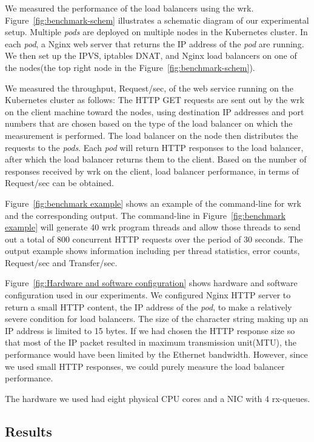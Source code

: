 We measured the performance of the load balancers using the wrk.
Figure~\ref{fig:benchmark-schem} illustrates a schematic diagram of our experimental setup.
Multiple {\em pods} are deployed on multiple nodes in the Kubernetes cluster. 
In each {\em pod}, a Nginx web server that returns the IP address of the {\em pod} are running.
We then set up the IPVS, iptables DNAT, and Nginx load balancers on one of the nodes(the top right node in the Figure~\ref{fig:benchmark-schem}). 

We measured the throughput, Request/sec, of the web service running on the Kubernetes cluster as follows:
The HTTP GET requests are sent out by the wrk on the client machine toward the nodes,
using destination IP addresses and port numbers that are chosen based on the type of the load balancer on which the measurement is performed.
The load balancer on the node then distributes the requests to the {\em pods}.
Each {\em pod} will return HTTP responses to the load balancer, after which the load balancer returns them to the client.
Based on the number of responses received by wrk on the client, 
load balancer performance, in terms of Request/sec can be obtained. 

Figure~\ref{fig:benchmark example} shows an example of the command-line for wrk and the corresponding output.
The command-line in Figure~\ref{fig:benchmark example} will generate 40 wrk program threads 
and allow those threads to send out a total of 800 concurrent HTTP requests over the period of 30 seconds.
The output example shows information including per thread statistics, error counts, Request/sec and Transfer/sec.

Figure~\ref{fig:Hardware and software configuration} shows hardware and software configuration used in our experiments.
We configured Nginx HTTP server to return a small HTTP content, 
the IP address of the {\em pod}, to make a relatively severe condition for load balancers. 
The size of the character string making up an IP address is limited to 15 bytes.
If we had chosen the HTTP response size so that most of the IP packet resulted in maximum transmission unit(MTU), 
the performance would have been limited by the Ethernet bandwidth.
However, since we used small HTTP responses, we could purely measure the load balancer performance.

The hardware we used had eight physical CPU cores and a NIC with 4 rx-queues.


\subsection{Results}

